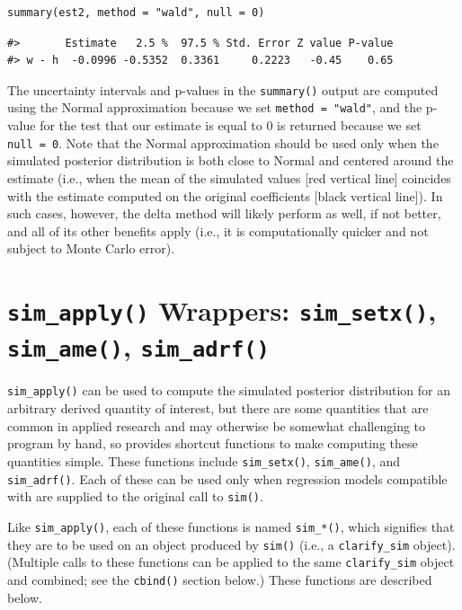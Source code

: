 \begin{verbatim}
summary(est2, method = "wald", null = 0)
\end{verbatim}

\begin{verbatim}
#>       Estimate   2.5 %  97.5 % Std. Error Z value P-value
#> w - h  -0.0996 -0.5352  0.3361     0.2223   -0.45    0.65
\end{verbatim}

The uncertainty intervals and p-values in the \texttt{summary()} output are computed using the Normal approximation because we set \texttt{method\ =\ "wald"}, and the p-value for the test that our estimate is equal to 0 is returned because we set \texttt{null\ =\ 0}. Note that the Normal approximation should be used only when the simulated posterior distribution is both close to Normal and centered around the estimate (i.e., when the mean of the simulated values {[}red vertical line{]} coincides with the estimate computed on the original coefficients {[}black vertical line{]}). In such cases, however, the delta method will likely perform as well, if not better, and all of its other benefits apply (i.e., it is computationally quicker and not subject to Monte Carlo error).

\hypertarget{sim_apply-wrappers-sim_setx-sim_ame-sim_adrf}{%
\section{\texorpdfstring{\texttt{sim\_apply()} Wrappers: \texttt{sim\_setx()}, \texttt{sim\_ame()}, \texttt{sim\_adrf()}}{sim\_apply() Wrappers: sim\_setx(), sim\_ame(), sim\_adrf()}}\label{sim_apply-wrappers-sim_setx-sim_ame-sim_adrf}}

\texttt{sim\_apply()} can be used to compute the simulated posterior distribution for an arbitrary derived quantity of interest, but there are some quantities that are common in applied research and may otherwise be somewhat challenging to program by hand, so  provides shortcut functions to make computing these quantities simple. These functions include \texttt{sim\_setx()}, \texttt{sim\_ame()}, and \texttt{sim\_adrf()}. Each of these can be used only when regression models compatible with  are supplied to the original call to \texttt{sim()}.

Like \texttt{sim\_apply()}, each of these functions is named \texttt{sim\_*()}, which signifies that they are to be used on an object produced by \texttt{sim()} (i.e., a \texttt{clarify\_sim} object). (Multiple calls to these functions can be applied to the same \texttt{clarify\_sim} object and combined; see the \texttt{cbind()} section below.) These functions are described below.

